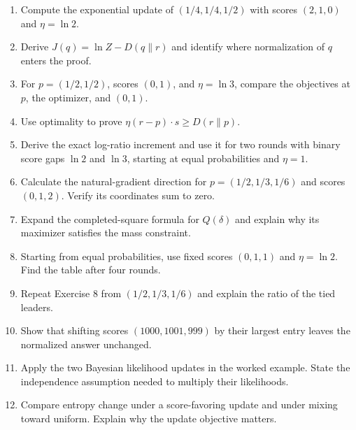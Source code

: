 \documentclass[11pt,oneside,openany]{book}
\theoremstyle{definition}
\theoremstyle{remark}
\newenvironment{exercises}{\begin{enumerate}[label=\thechapter.\arabic*,ref=\thechapter.\arabic*,leftmargin=2.8em,itemsep=6pt]}{\end{enumerate}}
\numberwithin{equation}{chapter}
\begin{document}
\begin{exercises}

\item 

Compute the exponential update of \((1/4,1/4,1/2)\) with scores \((2,1,0)\) and \(\eta=\ln2\).

\item 

Derive \(J(q)=\ln Z-D(q\|r)\) and identify where normalization of \(q\) enters the proof.

\item 

For \(p=(1/2,1/2)\), scores \((0,1)\), and \(\eta=\ln3\), compare the objectives at \(p\), the optimizer, and \((0,1)\).

\item 

Use optimality to prove \(\eta(r-p)\cdot s\geq D(r\|p)\).

\item 

Derive the exact log-ratio increment and use it for two rounds with binary score gaps \(\ln2\) and \(\ln3\), starting at equal probabilities and \(\eta=1\).

\item 

Calculate the natural-gradient direction for \(p=(1/2,1/3,1/6)\) and scores \((0,1,2)\). Verify its coordinates sum to zero.

\item 

Expand the completed-square formula for \(Q(\delta)\) and explain why its maximizer satisfies the mass constraint.

\item 

Starting from equal probabilities, use fixed scores \((0,1,1)\) and \(\eta=\ln2\). Find the table after four rounds.

\item 

Repeat Exercise 8 from \((1/2,1/3,1/6)\) and explain the ratio of the tied leaders.

\item 

Show that shifting scores \((1000,1001,999)\) by their largest entry leaves the normalized answer unchanged.

\item 

Apply the two Bayesian likelihood updates in the worked example. State the independence assumption needed to multiply their likelihoods.

\item 

Compare entropy change under a score-favoring update and under mixing toward uniform. Explain why the update objective matters.

\end{exercises}
\end{document}
